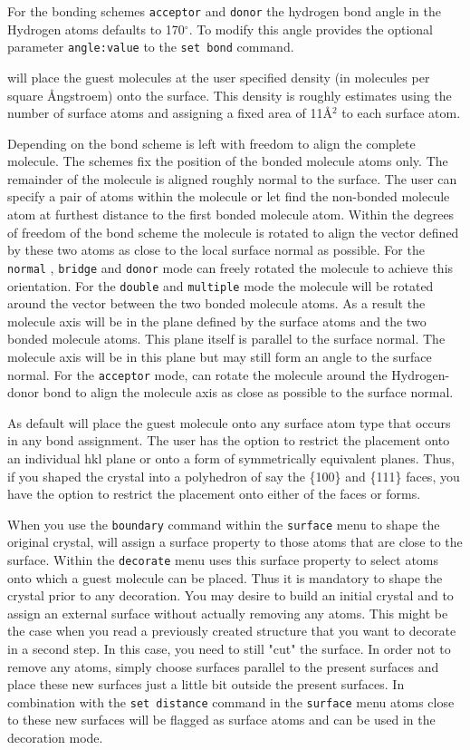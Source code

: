 For the bonding schemes {\tt acceptor} and {\tt donor} the 
hydrogen bond angle in the Hydrogen atoms defaults to 170$^\circ$.
To modify this angle \Discus provides the optional parameter
{\tt angle:value} to the {\tt set bond} command. 

\Discus will place the guest molecules at the user specified density 
(in molecules per square \AA ngstroem) onto the surface. This density
is roughly estimates using the number of surface atoms and assigning a
fixed area of 11\AA$^2$ to each surface atom. 

Depending on the bond scheme \Discus is left with freedom to align the complete
molecule. The schemes fix the position of the bonded molecule atoms only.
The remainder of the molecule is aligned roughly normal to the surface.
The user can specify a pair of atoms within the molecule or let \Discus
find the non-bonded molecule atom at furthest distance to the first
bonded molecule atom. Within the degrees of freedom of the bond scheme
the molecule is rotated to align the vector defined by these two atoms 
as close to the local surface normal as possible. For the {\tt normal}
, {\tt bridge} and {\tt donor} mode \Discus can freely rotated the 
molecule to achieve 
this orientation. For the {\tt double} and {\tt multiple} mode the 
molecule will be rotated around the vector between the two bonded molecule
atoms. As a result the molecule axis will be in the plane defined by the
surface atoms and the two bonded molecule atoms. This plane itself
is parallel to the surface normal. The molecule axis will be in this
plane but may still form an angle to the surface normal. For the
{\tt acceptor} mode, \Discus can rotate the molecule around the
Hydrogen-donor bond to align the molecule axis as close as possible to
the surface normal.

As default \Discus will place the guest molecule onto any surface atom type 
that occurs in any bond assignment. The user has the option to restrict
the placement onto an individual hkl plane or onto a form of symmetrically
equivalent planes. Thus, if you shaped the crystal into a polyhedron of
say the \{100\} and \{111\} faces, you have the option to restrict the 
placement onto either of the faces or forms.

When you use the {\tt boundary} command within the {\tt surface} menu to
shape the original crystal, \Discus will assign a surface property to 
those atoms that are close to the surface. Within the {\tt decorate} menu
\Discus uses this surface property to select atoms onto which a guest 
molecule can be placed. Thus it is mandatory to shape the crystal prior 
to any decoration. You may desire to build an initial crystal and to assign 
an external surface without actually removing any atoms. This might be
the case when you read a previously created structure that you want 
to decorate in a second step. In this case, you need to still "cut" 
the surface. In order not to remove any atoms, simply choose surfaces
parallel to the present surfaces and place these new surfaces just a little
bit outside the present surfaces. In combination with the 
{\tt set distance} command in the {\tt surface} menu atoms close to these
new surfaces will be flagged as surface atoms and can be used in the
decoration mode.

